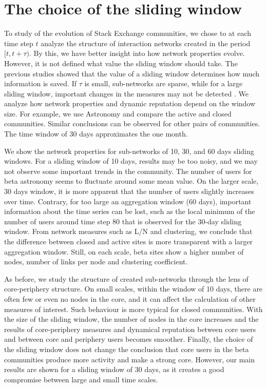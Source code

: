 \chapter{The choice of the sliding window} %
\label{App:sliding}

To study of the evolution of Stack Exchange communities, we chose to at each time step $t$ analyze the structure of interaction networks created in the period $[t, t+\tau)$. By this, we have better insight into how network properties evolve. However, it is not defined what value the sliding window should take. The previous studies showed that the value of a sliding window determines how much information is saved. If $\tau$ is small, sub-networks are sparse, while for a large sliding window, important changes in the measures may not be detected \cite{krings2012effects, arnold2021moving}. We analyze how network properties and dynamic reputation depend on the window size. For example, we use Astronomy and compare the active and closed communities. Similar conclusions can be observed for other pairs of communities. The time window of 30 days approximates the one month.  

We show the network properties for sub-networks of 10, 30, and 60 days sliding windows. For a sliding window of 10 days, results may be too noisy, and we may not observe some important trends in the community. The number of users for beta astronomy seems to fluctuate around some mean value. On the larger scale, 30 days window,  it is more apparent that the number of users slightly increases over time. Contrary, for too large an aggregation window (60 days), important information about the time series can be lost, such as the local minimum of the number of users around time step 80 that is observed for the 30-day sliding window. 
From network measures such as L/N and clustering, we conclude that the difference between closed and active sites is more transparent with a larger aggregation window. Still, on each scale, beta sites show a higher number of nodes, number of links per node and clustering coefficient.

As before, we study the structure of created sub-networks through the lens of core-periphery structure. On small scales, within the window of 10 days, there are often few or even no nodes in the core, and it can affect the calculation of other measures of interest. Such behaviour is more typical for closed communities. With the size of the sliding window, the number of nodes in the core increases and the results of core-periphery measures and dynamical reputation between core users and between core and periphery users becomes smoother. Finally, the choice of the sliding window does not change the conclusion that core users in the beta communities produce more activity and make a strong core. However, our main results are shown for a sliding window of 30 days, as it creates a good compromise between large and small time scales.   

